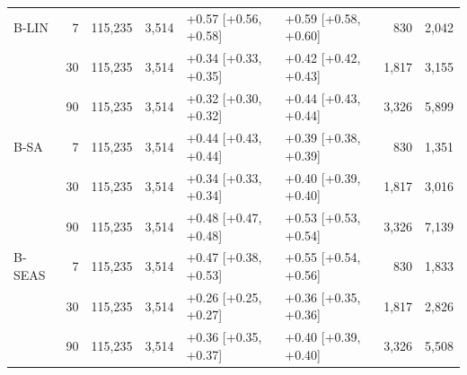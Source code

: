 \begin{tabular}{l r rr ll rr}
\addlinespace[2pt]
B-LIN & 7 & 115{,}235 & 3{,}514 & +0.57 {\scriptsize[+0.56, +0.58]} & +0.59 {\scriptsize[+0.58, +0.60]} & 830 & 2{,}042 \\
 & 30 & 115{,}235 & 3{,}514 & +0.34 {\scriptsize[+0.33, +0.35]} & +0.42 {\scriptsize[+0.42, +0.43]} & 1{,}817 & 3{,}155 \\
 & 90 & 115{,}235 & 3{,}514 & +0.32 {\scriptsize[+0.30, +0.32]} & +0.44 {\scriptsize[+0.43, +0.44]} & 3{,}326 & 5{,}899 \\
\addlinespace[2pt]
B-SA & 7 & 115{,}235 & 3{,}514 & +0.44 {\scriptsize[+0.43, +0.44]} & +0.39 {\scriptsize[+0.38, +0.39]} & 830 & 1{,}351 \\
 & 30 & 115{,}235 & 3{,}514 & +0.34 {\scriptsize[+0.33, +0.34]} & +0.40 {\scriptsize[+0.39, +0.40]} & 1{,}817 & 3{,}016 \\
 & 90 & 115{,}235 & 3{,}514 & +0.48 {\scriptsize[+0.47, +0.48]} & +0.53 {\scriptsize[+0.53, +0.54]} & 3{,}326 & 7{,}139 \\
\addlinespace[2pt]
B-SEAS & 7 & 115{,}235 & 3{,}514 & +0.47 {\scriptsize[+0.38, +0.53]} & +0.55 {\scriptsize[+0.54, +0.56]} & 830 & 1{,}833 \\
 & 30 & 115{,}235 & 3{,}514 & +0.26 {\scriptsize[+0.25, +0.27]} & +0.36 {\scriptsize[+0.35, +0.36]} & 1{,}817 & 2{,}826 \\
 & 90 & 115{,}235 & 3{,}514 & +0.36 {\scriptsize[+0.35, +0.37]} & +0.40 {\scriptsize[+0.39, +0.40]} & 3{,}326 & 5{,}508 \\
\bottomrule
\end{tabular}
